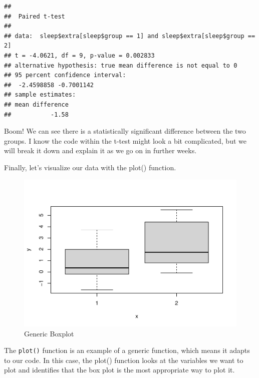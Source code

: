 \documentclass[
]{book}
\newenvironment{Shaded}{\begin{snugshade}}{\end{snugshade}}
\newcommand{\FunctionTok}[1]{\textcolor[rgb]{0.13,0.29,0.53}{\textbf{#1}}}
\newcommand{\NormalTok}[1]{#1}
\newcommand{\SpecialCharTok}[1]{\textcolor[rgb]{0.81,0.36,0.00}{\textbf{#1}}}
\begin{document}
\begin{verbatim}
## 
##  Paired t-test
## 
## data:  sleep$extra[sleep$group == 1] and sleep$extra[sleep$group == 2]
## t = -4.0621, df = 9, p-value = 0.002833
## alternative hypothesis: true mean difference is not equal to 0
## 95 percent confidence interval:
##  -2.4598858 -0.7001142
## sample estimates:
## mean difference 
##           -1.58
\end{verbatim}

Boom! We can see there is a statistically significant difference between the two groups. I know the code within the t-test might look a bit complicated, but we will break it down and explain it as we go on in further weeks.

Finally, let's visualize our data with the plot() function.

\begin{Shaded}
\end{Shaded}

\begin{figure}
\centering
\includegraphics{rintro_demo_files/figure-latex/unnamed-chunk-24-1.pdf}
\caption{\label{fig:unnamed-chunk-24}Generic Boxplot}
\end{figure}

The \texttt{plot()} function is an example of a generic function, which means it adapts to our code. In this case, the plot() function looks at the variables we want to plot and identifies that the box plot is the most appropriate way to plot it.
\end{document}
